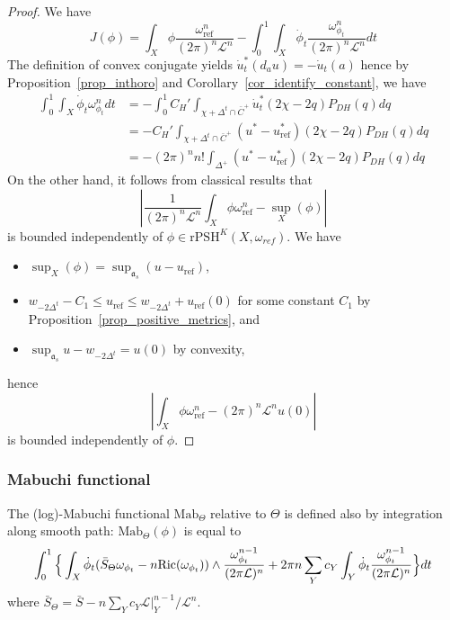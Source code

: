\documentclass{amsart}
\theoremstyle{definition}
\begin{document}
\begin{proof}
We have 
\[
J(\phi) = \int_{X} \phi \frac{\omega_{\mathrm{ref}}^n}{(2\pi)^n\mathcal{L}^n} 
- \int_0^1 \int_{X} \dot{\phi}_t \frac{\omega_{\phi_t}^n}{(2\pi)^n\mathcal{L}^n} dt
\]
The definition of convex conjugate yields $\dot{u}_t^*(d_au)=-\dot{u}_t(a)$ hence 
by Proposition~\ref{prop_inthoro} and Corollary~\ref{cor_identify_constant}, 
we have
\begin{align*}
\int_0^1 \int_X \dot{\phi}_t \omega_{\phi_t}^n dt & 
= - \int_0^1 C_H'\int_{\chi+\Delta^t\cap\bar{C}^+}\dot{u}_t^*(2\chi-2q)P_{DH}(q)dq 
\\
& = -C_H' \int_{\chi+\Delta^t\cap\bar{C}^+} (u^*-u_{\mathrm{ref}}^*)(2\chi-2q)P_{DH}(q)dq
\\
& = - (2\pi)^n n! \int_{\Delta^+} (u^*-u_{\mathrm{ref}}^*)(2\chi-2q)P_{DH}(q)dq
\end{align*}
On the other hand, it follows from classical results \cite[Proposition 2.7]{GZ05} that  
\[
\left|\frac{1}{(2\pi)^n\mathcal{L}^n}\int_X \phi \omega_{\mathrm{ref}}^n - 
\sup_X(\phi) \right|
\]
is bounded independently of $\phi\in\mathrm{rPSH}^K(X,\omega_{ref})$. 
We have 
\begin{itemize}
\item $\sup_X(\phi)=\sup_{\mathfrak{a}_s}(u-u_{\mathrm{ref}})$, 
\item $w_{-2\Delta^t}-C_1 \leq u_{\mathrm{ref}} \leq w_{-2\Delta^t}+u_{\mathrm{ref}}(0)$ for some constant $C_1$ by Proposition~\ref{prop_positive_metrics},  
and 
\item $\sup_{\mathfrak{a}_s} u-w_{-2\Delta^t} = u(0)$ by convexity, 
\end{itemize}
hence 
\[
\left|\int_X \phi \omega_{\mathrm{ref}}^n-(2\pi)^n\mathcal{L}^n u(0)\right|
\]
is bounded independently of $\phi$.
\end{proof}

\subsubsection{Mabuchi functional}

The (log)-Mabuchi functional $\mathrm{Mab}_{\Theta}$ relative to $\Theta$ is defined also 
by integration along smooth path: $\mathrm{Mab}_{\Theta}(\phi)$ is equal to 
\[
\int_0^1 \Big{\{} \int_{X} 
\dot{\phi}_t(\bar{S}_{\Theta}\omega_{\phi_t}-n\mathrm{Ric}(\omega_{\phi_t}))\wedge \frac{\omega_{\phi_t}^{n-1}}{(2\pi\mathcal{L})^n}  
+2\pi n\sum_Y c_Y \int_{Y}\dot{\phi}_t\frac{\omega_{\phi_t}^{n-1}}{(2\pi\mathcal{L})^n}  
\Big{\}}dt
\] 
where 
$\bar{S}_{\Theta}=\bar{S}-n\sum_Yc_Y\mathcal{L}|_Y^{n-1}/\mathcal{L}^n$.
\end{document}

